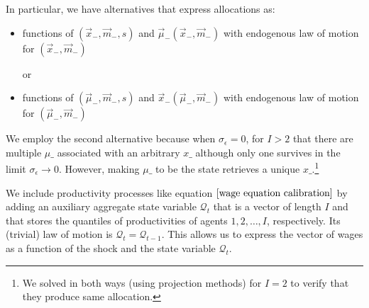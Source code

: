 \documentclass[thmsb,11pt]{article}
\begin{document}
In particular, we have alternatives that express allocations as:
	\begin{itemize}
		\item  functions of $(\vec x_-,\vec m_-,s)$ and $\vec\mu_-(\vec x_-,\vec m_-)$ with endogenous law of motion for $(\vec x_-,\vec m_-)$

		or
		
		\item  functions of $(\vec \mu_-,\vec m_-,s)$ and $\vec x_-(\vec \mu_-,\vec m_-)$ with endogenous law of motion for $(\vec \mu_-,\vec m_-)$
	\end{itemize}
We employ the second alternative because when  $\sigma_{\epsilon}=0$, for $I>2$ that there are multiple $\mu\_$ associated with an arbitrary $x\_$ although only one survives in the limit $\sigma_{\epsilon}\to 0$.  However, making $\mu\_$  to be the state retrieves a unique $x\_$.\footnote{We solved in both ways (using projection methods) for $I = 2$ to verify that they produce same allocation.}

 We include productivity processes like equation $\eqref{wage equation calibration}$  by adding an auxiliary aggregate state variable $\mathcal{Q}_t$ that is a vector of length $I$ and that stores the quantiles of productivities of agents $1,2,\ldots,I$, respectively. Its (trivial) law of motion is $\mathcal{Q}_t=\mathcal{Q}_{t-1}$. This allows us to express the vector of wages as a function of the shock and the state variable $\mathcal{Q}_t$.








\newpage
\end{document}
